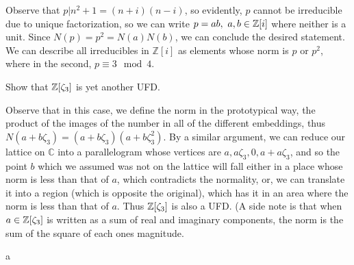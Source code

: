 Observe that \(p|n^2+1=(n+i)(n-i)\), so evidently, \(p\) cannot be irreducible due to unique factorization, so we can write \(p=ab, \ a,b \in \mathbb Z[i] \) where neither is a unit. Since \(N(p)=p^2=N(a)N(b)\), we can conclude the desired statement.
We can describe all irreducibles in \(\mathbb{Z}[i]\) as elements whose norm is \(p\) or \(p^2\), where in the second, \( p \equiv 3 \mod 4\).

\begin{problem}
Show that \(\mathbb Z[\zeta_3]\) is yet another UFD.
\end{problem}

Observe that in this case, we define the norm in the prototypical way, the product of the images of the number in all of the different embeddings, thus \(N(a+b\zeta_3)=(a+b\zeta_3)(a+b\zeta_3^2)\). By a similar argument, we can reduce our lattice on \(\mathbb{C}\) into a parallelogram whose vertices are \(a, a\zeta_3, 0, a+a\zeta_3\), and so the point \(b\) which we assumed was not on the lattice will fall either in a place whose norm is less than that of \(a\), which contradicts the normality, or, we can translate it into a region (which is opposite the original), which has it in an area where the norm is less than that of \(a\). Thus \(\mathbb Z[\zeta_3]\) is also a UFD. (A side note is that when \(a \in \mathbb Z[\zeta_3]\) is written as a sum of real and imaginary components, the norm is the sum of the square of each ones magnitude.

\begin{problem}
a
\end{problem}
